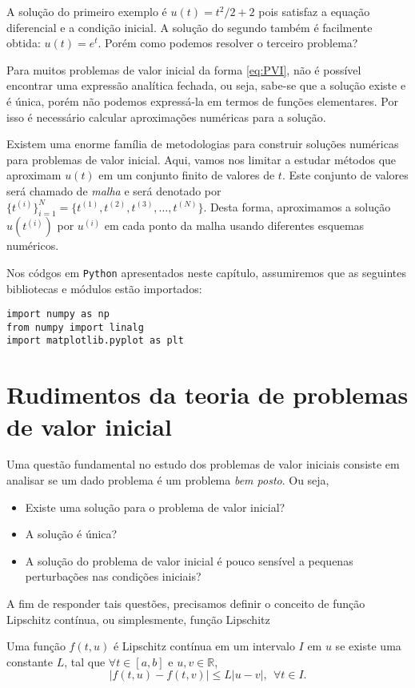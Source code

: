 A solução do primeiro exemplo é $u(t)=t^2/2+2$ pois satisfaz a equação diferencial e a condição inicial. A solução do segundo também é facilmente obtida: $u(t)=e^t$. Porém como podemos resolver o terceiro problema?

Para muitos problemas de valor inicial da forma \eqref{eq:PVI}, não é possível encontrar uma expressão analítica fechada, ou seja, sabe-se que a solução existe e é única, porém não podemos expressá-la em termos de funções elementares. Por isso é necessário calcular aproximações numéricas para a solução.

Existem uma enorme família de metodologias para construir soluções numéricas para problemas de valor inicial. Aqui, vamos nos limitar a estudar métodos que aproximam $u(t)$ em um conjunto finito de valores de $t$. Este conjunto de valores será chamado de \emph{malha} e será denotado por  $\{t^{(i)}\}_{i=1}^N=\{t^{(1)}, t^{(2)}, t^{(3)},\ldots, t^{(N)}\}$. Desta forma, aproximamos a solução $u(t^{(i)})$ por $u^{(i)}$ em cada ponto da malha usando diferentes esquemas numéricos.

\ifispython
Nos códgos em \verb+Python+ apresentados neste capítulo, assumiremos que as seguintes bibliotecas e módulos estão importados:
\begin{verbatim}
import numpy as np
from numpy import linalg
import matplotlib.pyplot as plt
\end{verbatim}
\fi

\section{Rudimentos da teoria de problemas de valor inicial}
Uma questão fundamental no estudo dos problemas de valor iniciais consiste em analisar se um dado problema é um problema \emph{bem posto}. Ou seja,
\begin{itemize}
 \item Existe uma solução para o problema de valor inicial?
 \item A solução é única?
 \item A solução do problema de valor inicial é pouco sensível a pequenas perturbações nas condições iniciais?
\end{itemize}

A fim de responder tais questões, precisamos definir o conceito de função Lipschitz contínua, ou simplesmente, função Lipschitz 
\begin{defn}
Uma função $f(t, u)$ é Lipschitz contínua em um intervalo $I$ em $u$ se existe uma constante $L$, tal que $\forall t \in [a, b]$ e $u, v \in \mathbb R$,
\begin{equation}  |f(t, u)-f(t, v)| \leq L|u-v|,~~\forall t\in I.  \end{equation}
\end{defn}

